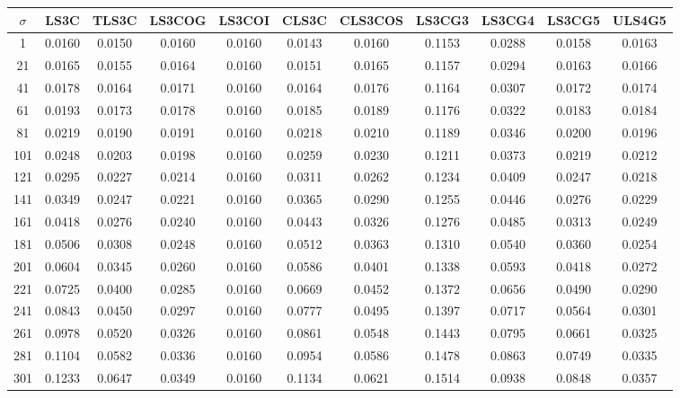 \begin{table}[ht!]
\centering
\begin{tabular}{c|c|c|c|c|c|c|c|c|c|c}
$\sigma$ & \scriptsize{LS3C} & \scriptsize{TLS3C} & \scriptsize{LS3COG} & \scriptsize{LS3COI} & \scriptsize{CLS3C} & \scriptsize{CLS3COS} & \scriptsize{LS3CG3} & \scriptsize{LS3CG4} & \scriptsize{LS3CG5} & \scriptsize{ULS4G5}\\ \hline 
1 & 0.0160 & 0.0150 & 0.0160 & 0.0160 & 0.0143 & 0.0160 & 0.1153 & 0.0288 & 0.0158 & 0.0163 \\ \hline
21 & 0.0165 & 0.0155 & 0.0164 & 0.0160 & 0.0151 & 0.0165 & 0.1157 & 0.0294 & 0.0163 & 0.0166 \\ \hline
41 & 0.0178 & 0.0164 & 0.0171 & 0.0160 & 0.0164 & 0.0176 & 0.1164 & 0.0307 & 0.0172 & 0.0174 \\ \hline
61 & 0.0193 & 0.0173 & 0.0178 & 0.0160 & 0.0185 & 0.0189 & 0.1176 & 0.0322 & 0.0183 & 0.0184 \\ \hline
81 & 0.0219 & 0.0190 & 0.0191 & 0.0160 & 0.0218 & 0.0210 & 0.1189 & 0.0346 & 0.0200 & 0.0196 \\ \hline
101 & 0.0248 & 0.0203 & 0.0198 & 0.0160 & 0.0259 & 0.0230 & 0.1211 & 0.0373 & 0.0219 & 0.0212 \\ \hline
121 & 0.0295 & 0.0227 & 0.0214 & 0.0160 & 0.0311 & 0.0262 & 0.1234 & 0.0409 & 0.0247 & 0.0218 \\ \hline
141 & 0.0349 & 0.0247 & 0.0221 & 0.0160 & 0.0365 & 0.0290 & 0.1255 & 0.0446 & 0.0276 & 0.0229 \\ \hline
161 & 0.0418 & 0.0276 & 0.0240 & 0.0160 & 0.0443 & 0.0326 & 0.1276 & 0.0485 & 0.0313 & 0.0249 \\ \hline
181 & 0.0506 & 0.0308 & 0.0248 & 0.0160 & 0.0512 & 0.0363 & 0.1310 & 0.0540 & 0.0360 & 0.0254 \\ \hline
201 & 0.0604 & 0.0345 & 0.0260 & 0.0160 & 0.0586 & 0.0401 & 0.1338 & 0.0593 & 0.0418 & 0.0272 \\ \hline
221 & 0.0725 & 0.0400 & 0.0285 & 0.0160 & 0.0669 & 0.0452 & 0.1372 & 0.0656 & 0.0490 & 0.0290 \\ \hline
241 & 0.0843 & 0.0450 & 0.0297 & 0.0160 & 0.0777 & 0.0495 & 0.1397 & 0.0717 & 0.0564 & 0.0301 \\ \hline
261 & 0.0978 & 0.0520 & 0.0326 & 0.0160 & 0.0861 & 0.0548 & 0.1443 & 0.0795 & 0.0661 & 0.0325 \\ \hline
281 & 0.1104 & 0.0582 & 0.0336 & 0.0160 & 0.0954 & 0.0586 & 0.1478 & 0.0863 & 0.0749 & 0.0335 \\ \hline
301 & 0.1233 & 0.0647 & 0.0349 & 0.0160 & 0.1134 & 0.0621 & 0.1514 & 0.0938 & 0.0848 & 0.0357 \\ \hline

\end{tabular}
\end{table}
